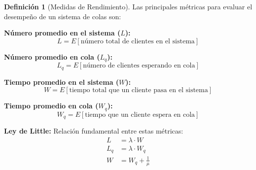 \documentclass[12pt, a4paper, oneside]{book}
\theoremstyle{definition}
\newtheorem{definicion}{Definición}[chapter]
\begin{document}
\begin{definicion}[Medidas de Rendimiento]
Las principales métricas para evaluar el desempeño de un sistema de colas son:

\textbf{Número promedio en el sistema ($L$):}
$$L = E[\text{número total de clientes en el sistema}]$$

\textbf{Número promedio en cola ($L_q$):}
$$L_q = E[\text{número de clientes esperando en cola}]$$

\textbf{Tiempo promedio en el sistema ($W$):}
$$W = E[\text{tiempo total que un cliente pasa en el sistema}]$$

\textbf{Tiempo promedio en cola ($W_q$):}
$$W_q = E[\text{tiempo que un cliente espera en cola}]$$

\textbf{Ley de Little:} Relación fundamental entre estas métricas:
\begin{align}
L &= \lambda \cdot W \\
L_q &= \lambda \cdot W_q \\
W &= W_q + \frac{1}{\mu}
\end{align}
\end{definicion}
\end{document}
